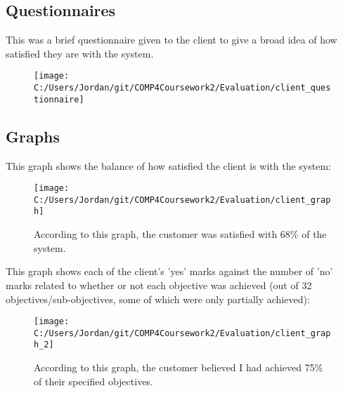 \subsection{Questionnaires}

This was a brief questionnaire given to the client to give a broad idea of how satisfied they are with the system.

\begin{figure}[H]
	\texttt{[image: C:/Users/Jordan/git/COMP4Coursework2/Evaluation/client\_questionnaire]}
\end{figure}

\subsection{Graphs}

This graph shows the balance of how satisfied the client is with the system:

\begin{figure}[H]
	\texttt{[image: C:/Users/Jordan/git/COMP4Coursework2/Evaluation/client\_graph]}
	\caption{According to this graph, the customer was satisfied with 68\% of the system.}
\end{figure}

This graph shows each of the client's 'yes' marks  against the number of 'no' marks related to whether or not each objective was achieved (out of 32 objectives/sub-objectives, some of which were only partially achieved):

\begin{figure}[H]
	\texttt{[image: C:/Users/Jordan/git/COMP4Coursework2/Evaluation/client\_graph\_2]}
	\caption{According to this graph, the customer believed I had achieved 75\% of their specified objectives.}
\end{figure}
